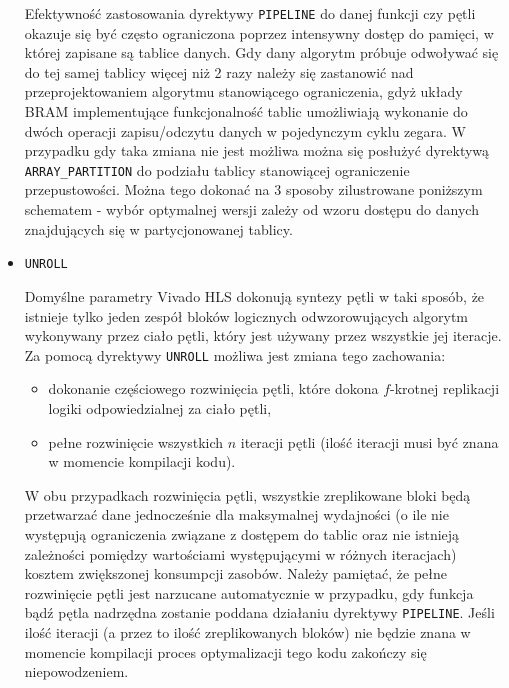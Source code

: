 \begin{itemize}
Efektywność zastosowania dyrektywy \texttt{PIPELINE} do danej funkcji czy pętli okazuje się być często ograniczona poprzez intensywny dostęp do pamięci, w której zapisane są tablice danych. Gdy dany algorytm próbuje odwoływać się do tej samej tablicy więcej niż 2 razy należy się zastanowić nad przeprojektowaniem algorytmu stanowiącego ograniczenia, gdyż układy BRAM implementujące funkcjonalność tablic umożliwiają wykonanie do dwóch operacji zapisu/odczytu danych w pojedynczym cyklu zegara. W przypadku gdy taka zmiana nie jest możliwa można się posłużyć dyrektywą \texttt{ARRAY\_PARTITION} do podziału tablicy stanowiącej ograniczenie przepustowości. Można tego dokonać na 3 sposoby zilustrowane poniższym schematem - wybór optymalnej wersji zależy od wzoru dostępu do danych znajdujących się w partycjonowanej tablicy.

\item \texttt{UNROLL}

Domyślne parametry Vivado HLS dokonują syntezy pętli w taki sposób, że istnieje tylko jeden zespół bloków logicznych odwzorowujących algorytm wykonywany przez ciało pętli, który jest używany przez wszystkie jej iteracje. Za pomocą dyrektywy \texttt{UNROLL} możliwa jest zmiana tego zachowania:
\begin{itemize}
\item dokonanie częściowego rozwinięcia pętli, które dokona $f$-krotnej replikacji logiki odpowiedzialnej za ciało pętli,
\item pełne rozwinięcie wszystkich $n$ iteracji pętli (ilość iteracji musi być znana w momencie kompilacji kodu).  
\end{itemize}
W obu przypadkach rozwinięcia pętli, wszystkie zreplikowane bloki będą przetwarzać dane jednocześnie dla maksymalnej wydajności (o ile nie występują ograniczenia związane z dostępem do tablic oraz nie istnieją zależności pomiędzy wartościami występującymi w różnych iteracjach) kosztem zwiększonej konsumpcji zasobów. Należy pamiętać, że pełne rozwinięcie pętli jest narzucane automatycznie w przypadku, gdy funkcja bądź pętla nadrzędna zostanie poddana działaniu dyrektywy \texttt{PIPELINE}. Jeśli ilość iteracji (a przez to ilość zreplikowanych bloków) nie będzie znana w momencie kompilacji proces optymalizacji tego kodu zakończy się niepowodzeniem.


\end{itemize}
